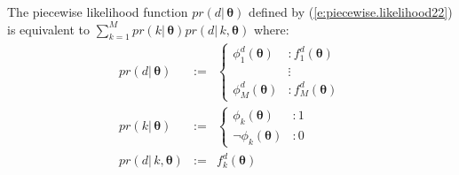 \begin{proposition}
\label{pro:discrete}
The piecewise likelihood function $pr(d | \, \boldsymbol\theta)$ 
defined by (\ref{e:piecewise.likelihood22}) is equivalent to 
$\sum_{k = 1}^M pr(k | \, \boldsymbol\theta) pr(d | \, k, \boldsymbol\theta)$
where:
{\footnotesize
\begin{eqnarray}
pr(d | \, \boldsymbol\theta) &:=& 
\begin{cases}
\phi^d_1(\boldsymbol\theta)  &: f^d_1(\boldsymbol\theta)\\
									  &\vdots\\
\phi^d_M(\boldsymbol\theta)  &: f^d_M(\boldsymbol\theta)
\end{cases}
\label{e:piecewise.likelihood22}
\\
pr(k |\, \boldsymbol\theta) &:=& 
\begin{cases}
\phi_k(\boldsymbol\theta)  &: 1\\
\neg \phi_k(\boldsymbol\theta) &: 0
\end{cases}
\label{e:2rel22}
\\
pr(d | \, k, \boldsymbol\theta) &:=& f^d_k(\boldsymbol\theta)
\label{e:2rel222}
\end{eqnarray}
}
%
\end{proposition}


